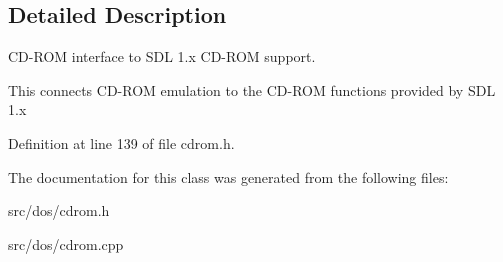 \subsection{Detailed Description}
C\-D-\/\-R\-O\-M interface to S\-D\-L 1.\-x C\-D-\/\-R\-O\-M support. 

This connects C\-D-\/\-R\-O\-M emulation to the C\-D-\/\-R\-O\-M functions provided by S\-D\-L 1.\-x 

Definition at line 139 of file cdrom.\-h.



The documentation for this class was generated from the following files\-:\begin{DoxyCompactItemize}
\item 
src/dos/cdrom.\-h\item 
src/dos/cdrom.\-cpp\end{DoxyCompactItemize}
